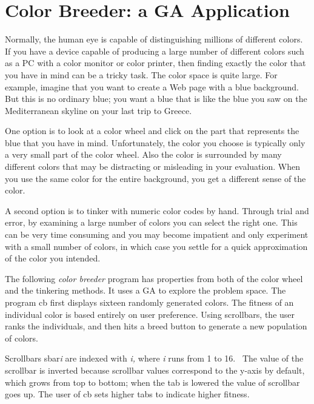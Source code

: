 \section{Color Breeder: a GA Application}

Normally, the human eye is capable of distinguishing millions of
different colors. If you have a device capable of producing a large
number of different colors such as a PC with a color monitor or color
printer, then finding exactly the color that you have in mind can be a
tricky task. The color space is quite large. For example, imagine that
you want to create a Web page with a blue background. But this is no
ordinary blue; you want a blue that is like the blue you saw on the
Mediterranean skyline on your last trip to Greece. \ 

One option is to look at a color wheel and click on the part that
represents the blue that you have in mind. Unfortunately,
the color you choose is typically only a very small part of the
color wheel. Also the color is surrounded by many different colors that
may be distracting or misleading in your evaluation. When you use the
same color for the entire background, you get a different sense of the
color. 

A second option is to tinker with numeric color codes by hand. Through
trial and error, by examining a large number of colors you can select
the right one. This can be very time consuming and you may become
impatient and only experiment with a small number of colors, in which
case you settle for a quick approximation of the color you intended.

The following \textit{color breeder} program has properties from both of
the color wheel and the tinkering methods. It uses a GA to explore the
problem space. The program \textsf{cb} first displays sixteen randomly
generated colors. The fitness of an individual color is based entirely
on user preference. Using scrollbars, the user ranks the individuals,
and then hits a breed button to generate a new population of colors. 

Scrollbars \textsf{sbar}\textsf{\textit{i}} are indexed with
\textsf{\textit{i}}\textit{,} where \textsf{\textit{i}} runs from 1 to
16. \ The value of the scrollbar is inverted because scrollbar values
correspond to the y-axis by default, which grows from top to bottom;
when the tab is lowered the value of scrollbar goes up. The user of
\textsf{cb} sets higher tabs to indicate higher fitness.


